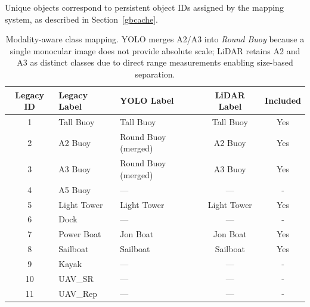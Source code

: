 \documentclass{erauthesis}
\begin{document}


Unique objects correspond to persistent object IDs assigned by the mapping system, as described in Section~\ref{gbcache}.

\begin{table}[ht]
\centering
\begin{tabular}{cllcc}
\hline
Legacy ID & Legacy Label & YOLO Label & LiDAR Label  & Included \\
\hline
1  & Tall Buoy          & Tall Buoy              & Tall Buoy          & Yes \\
2  & A2 Buoy            & Round Buoy (merged)    & A2 Buoy            & Yes \\
3  & A3 Buoy            & Round Buoy (merged)    & A3 Buoy            & Yes \\
4  & A5  Buoy           & —                      & —                  & - \\
5  & Light Tower        & Light Tower            & Light Tower        & Yes \\
6  & Dock               & —                      & —                  & - \\
7  & Power Boat         & Jon Boat               & Jon Boat           & Yes \\
8  & Sailboat           & Sailboat               & Sailboat           & Yes \\
9  & Kayak              & —                      & —                  & - \\
10 & UAV\_SR    & —                      & —                  & - \\
11 & UAV\_Rep   & —                      & —                  & - \\
\hline
\end{tabular}
\caption{Modality-aware class mapping. YOLO merges A2/A3 into \emph{Round Buoy} because a single monocular image does not provide absolute scale; LiDAR retains A2 and A3 as distinct classes due to direct range measurements enabling size-based separation.}
\label{tab:class_map}
\end{table}
\end{document}
